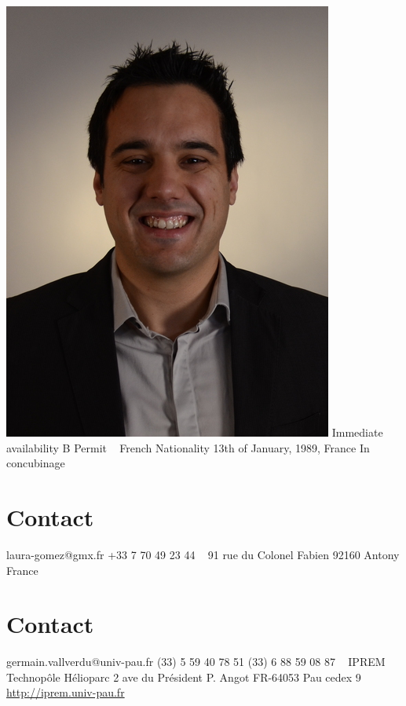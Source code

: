 \documentclass{cv-style}     %
\begin{document}


\begin{aside}
    \includegraphics[width=.8\columnwidth]{img/gvallver-red2}
    {\color{gray} \faFlask}Immediate availability
    {\color{gray} \faFlask}B Permit
    ~
    French Nationality
    13th of January, 1989, France
    In concubinage
    \section{Contact}
    laura-gomez@gmx.fr
    +33 7 70 49 23 44
    ~
    91 rue du Colonel Fabien
    92160 Antony
    France
    \section{Contact}
    germain.vallverdu@univ-pau.fr
    (33) 5 59 40 78 51
    (33) 6 88 59 08 87
    ~
    {\color{gray} \faFlask} IPREM
    Technopôle Hélioparc
    2 ave du Président P. Angot
    FR-64053 Pau cedex 9
    \href{http://iprem.univ-pau.fr/fr/index.html}{http://iprem.univ-pau.fr}

\end{aside}
\end{document}
